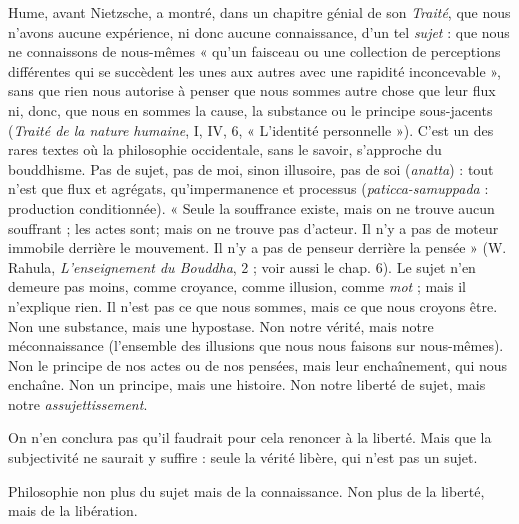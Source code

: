 Hume, avant Nietzsche, a montré, dans un chapitre génial de son {\it Traité},
que nous n’avons aucune expérience, ni donc aucune connaissance, d’un tel
{\it sujet} : que nous ne connaissons de nous-mêmes « qu’un faisceau ou une collection
de perceptions différentes qui se succèdent les unes aux autres avec une
rapidité inconcevable », sans que rien nous autorise à penser que nous sommes
autre chose que leur flux ni, donc, que nous en sommes la cause, la substance
ou le principe sous-jacents ({\it Traité de la nature humaine}, I, IV, 6, « L'identité
personnelle »). C’est un des rares textes où la philosophie occidentale, sans le
savoir, s'approche du bouddhisme. Pas de sujet, pas de moi, sinon illusoire, pas
de soi ({\it anatta}) : tout n’est que flux et agrégats, qu’impermanence et processus
({\it paticca-samuppada} : production conditionnée). « Seule la souffrance existe,
mais on ne trouve aucun souffrant ; les actes sont; mais on ne trouve pas
d’acteur. Il n’y a pas de moteur immobile derrière le mouvement. Il n’y a pas
de penseur derrière la pensée » (W. Rahula, {\it L'enseignement du Bouddha}, 2 ; voir
aussi le chap. 6). Le sujet n’en demeure pas moins, comme croyance, comme
illusion, comme {\it mot} ; mais il n’explique rien. Il n’est pas ce que nous sommes,
mais ce que nous croyons être. Non une substance, mais une hypostase. Non
notre vérité, mais notre méconnaissance (l’ensemble des illusions que nous
nous faisons sur nous-mêmes). Non le principe de nos actes ou de nos pensées,
mais leur enchaînement, qui nous enchaîne. Non un principe, mais une histoire.
Non notre liberté de sujet, mais notre {\it assujettissement}.

On n’en conclura pas qu’il faudrait pour cela renoncer à la liberté. Mais
que la subjectivité ne saurait y suffire : seule la vérité libère, qui n'est pas un
sujet.

Philosophie non plus du sujet mais de la connaissance. Non plus de la
liberté, mais de la libération.

